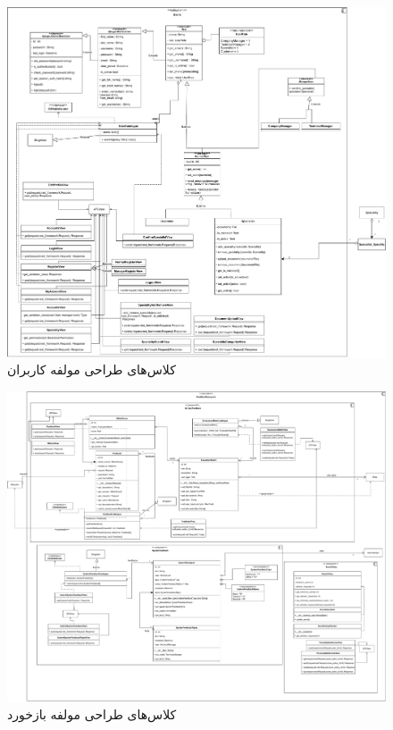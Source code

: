 \eject \pdfpagewidth=15in \pdfpageheight=18in

\begin{figure}[ht!]
	\centering
	\includegraphics[scale=0.8]{figs/design-class/users.pdf}
	\caption{کلاس‌های طراحی مولفه کاربران}
\end{figure}
\FloatBarrier
\newpage


\eject \pdfpagewidth=21in \pdfpageheight=18in

\begin{figure}[ht!]
	\centering
	\includegraphics[scale=0.8]{figs/design-class/feedback.pdf}
	\caption{کلاس‌های طراحی مولفه بازخورد}
\end{figure}
\FloatBarrier
\newpage

